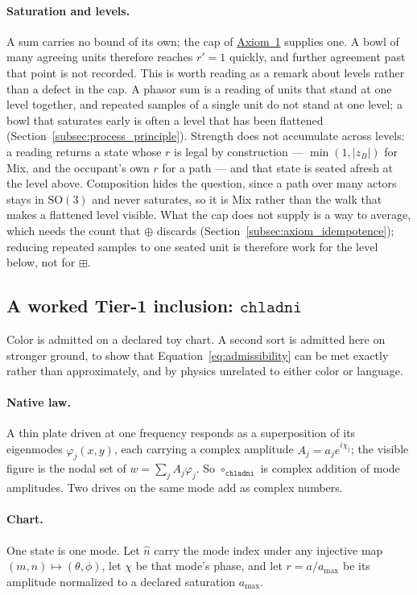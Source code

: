 \documentclass[12pt, a4paper]{article}
\begin{document}
\paragraph{Saturation and levels.}
A sum carries no bound of its own; the cap of
\hyperref[subsec:axiom1]{Axiom~1} supplies one. A bowl of many agreeing units
therefore reaches $r'=1$ quickly, and further agreement past that
point is not recorded. This is worth reading as a remark about levels
rather than a defect in the cap. A phasor sum is a reading of units
that stand at one level together, and repeated samples of a single
unit do not stand at one level; a bowl that saturates early is often a
level that has been flattened
(Section~\ref{subsec:process_principle}). Strength does not
accumulate across levels: a reading returns a state whose $r$ is legal
by construction --- $\min(1,|z_B|)$ for Mix, and the occupant's own
$r$ for a path --- and that state is seated afresh at the level above.
Composition hides the question, since a path over many actors stays in
$\mathrm{SO}(3)$ and never saturates, so it is Mix rather than the
walk that makes a flattened level visible. What the cap does not
supply is a way to average, which needs the count that $\oplus$
discards (Section~\ref{subsec:axiom_idempotence}); reducing repeated
samples to one seated unit is therefore work for the level below, not
for $\boxplus$.

\subsection{A worked Tier-1 inclusion: \texorpdfstring{$\mathtt{chladni}$}{chladni}}
\label{subsec:chladni_inclusion}
Color is admitted on a declared toy chart. A second sort is admitted
here on stronger ground, to show that
Equation~\eqref{eq:admissibility} can be met exactly rather than
approximately, and by physics unrelated to either color or language.

\paragraph{Native law.}
A thin plate driven at one frequency responds as a superposition of
its eigenmodes $\varphi_j(x,y)$, each carrying a complex amplitude
$A_j=a_j e^{i\chi_j}$; the visible figure is the nodal set of
$w=\sum_j A_j\varphi_j$. So $\circ_{\mathtt{chladni}}$ is complex
addition of mode amplitudes. Two drives on the same mode add as
complex numbers.

\paragraph{Chart.}
One state is one mode. Let $\hat n$ carry the mode index under any
injective map $(m,n)\mapsto(\theta,\phi)$, let $\chi$ be that mode's
phase, and let $r=a/a_{\max}$ be its amplitude normalized to a
declared saturation $a_{\max}$.
\end{document}
